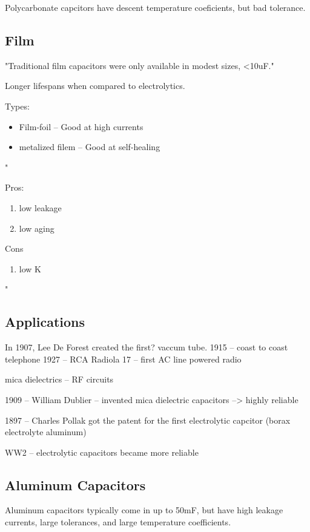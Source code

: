 Polycarbonate capcitors have descent temperature coeficients, but bad tolerance.  \cite{learn_caps}

\subsection{Film}

"Traditional film capacitors were only available in modest sizes, <10uF."

Longer lifespans when compared to electrolytics.

Types:
\begin{itemize}
    \item Film-foil -- Good at high currents
    \item metalized filem -- Good at self-healing
\end{itemize}

"

Pros:
\begin{enumerate}
    \item low leakage
    \item low aging
\end{enumerate}

Cons
\begin{enumerate}
    \item low K
\end{enumerate}

"
\cite{capSite_intro}

\subsection{Applications}

In 1907, Lee De Forest created the first? vaccum tube. \cite{deis_hist}
1915 -- coast to coast telephone
1927 -- RCA Radiola 17 -- first AC line powered radio

mica dielectrics -- RF circuits

1909 -- William Dublier -- invented mica dielectric capacitors
--> highly reliable

1897 -- Charles Pollak got the patent for the first electrolytic capcitor (borax electrolyte aluminum)

WW2 -- electrolytic capacitors became more reliable

\subsection{Aluminum Capacitors}

Aluminum capacitors typically come in up to 50mF, but have high leakage currents, large tolerances, and large temperature coefficients. \cite{learn_caps}

